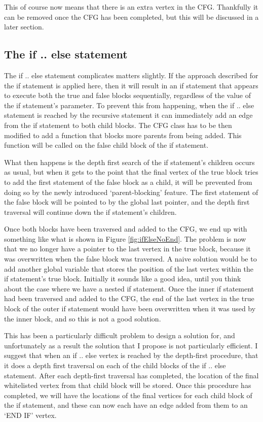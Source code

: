 This of course now means that there is an extra vertex in the CFG. Thankfully it can be removed once the CFG has been completed, but this will be discussed in a later section.

\subsection{The if .. else statement}

The if .. else statement complicates matters slightly. If the approach described for the if statement is applied here, then it will result in an if statement that appears to execute both the true and false blocks sequentially, regardless of the value of the if statement's parameter. To prevent this from happening, when the if .. else statement is reached by the recursive statement it can immediately add an edge from the if statement to both child blocks. The CFG class has to be then modified to add a function that blocks more parents from being added. This function will be called on the false child block of the if statement.

What then happens is the depth first search of the if statement's children occurs as usual, but when it gets to the point that the final vertex of the true block tries to add the first statement of the false block as a child, it will be prevented from doing so by the newly introduced `parent-blocking' feature. The first statement of the false block will be pointed to by the global last pointer, and the depth first traversal will continue down the if statement's children.

Once both blocks have been traversed and added to the CFG, we end up with something like what is shown in Figure \ref{fig:ifElseNoEnd}. The problem is now that we no longer have a pointer to the last vertex in the true block, because it was overwritten when the false block was traversed. A naive solution would be to add another global variable that stores the position of the last vertex within the if statement's true block. Initially it sounds like a good idea, until you think about the case where we have a nested if statement. Once the inner if statement had been traversed and added to the CFG, the end of the last vertex in the true block of the outer if statement would have been overwritten when it was used by the inner block, and so this is not a good solution.

This has been a particularly difficult problem to design a solution for, and unfortunately as a result the solution that I propose is not particularly efficient. I suggest that when an if .. else vertex is reached by the depth-first procedure, that it does a depth first traversal on each of the child blocks of the if .. else statement. After each depth-first traversal has completed, the location of the final whitelisted vertex from that child block will be stored. Once this procedure has completed, we will have the locations of the final vertices for each child block of the if statement, and these can now each have an edge added from them to an `END IF' vertex.

